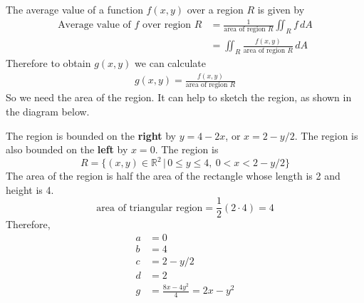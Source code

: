     \ifnum {} 
    {\color{DarkBlue} 
    The average value of a function $f(x,y)$ over a region $R$ is given by 
    \begin{align}
        \text{Average value of }f\text{ over region }R &= \frac{1}{\text{area of region }R}\iint_R f \, dA \\&= \iint_R \frac{f(x,y)}{\text{area of region }R} \, dA
    \end{align}
    Therefore to obtain $g(x,y)$ we can calculate
    \begin{align}
        g(x,y) = \frac{f(x,y)}{\text{area of region }R}
    \end{align}
    So we need the area of the region. It can help to sketch the region, as shown in the diagram below. 
       \begin{center}     
    \end{center}     
    The region is bounded on the \textbf{right} by $y=4-2x$, or $x=2-y/2$. The region is also bounded on the \textbf{left} by $x=0$. The region is 
    $$R = \{(x,y) \in \mathbb R^2 \, | \, 0\le y \le 4, \ 0 < x < 2-y/2\}$$
    The area of the region is half the area of the rectangle whose length is 2 and height is 4. 
    $$\text{area of triangular region} = \frac12 ( 2 \cdot 4) = 4$$    
    Therefore, 
    \begin{align}
        a & = 0 \\
        b &= 4 \\
        c &= 2-y/2 \\
        d &= 2 \\
        g &= \frac{8x-4y^2}{4} = 2x - y^2
    \end{align}
    }
   \else

